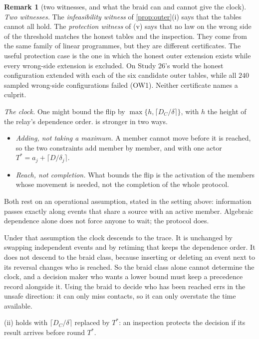 \documentclass[11pt]{article}
\theoremstyle{definition}\newtheorem{definition}[theorem]{Definition}\newtheorem{remark}[theorem]{Remark}\newtheorem{example}[theorem]{Example}\newtheorem{problem}[theorem]{Open problem}\crefname{problem}{Problem}{Problems}
\begin{document}
\begin{remark}[two witnesses, and what the braid can and cannot give the clock]\label{rem:twowitness}
\emph{Two witnesses.} The \emph{infeasibility witness} of \cref{prop:outer}(i) says that the tables cannot all hold. The \emph{protection witness} of (v) says that no law on the wrong side of the threshold matches the honest tables and the inspection. They come from the same family of linear programmes, but they are different certificates. The useful protection case is the one in which the honest outer extension exists while every wrong-side extension is excluded. On Study 26's world the honest configuration extended with each of the six candidate outer tables, while all $240$ sampled wrong-side configurations failed (OW1). Neither certificate names a culprit.

\emph{The clock.} One might bound the flip by $\max\{h,\lceil D_C/\delta\rceil\}$, with $h$ the height of the relay's dependence order.  is stronger in two ways.
\begin{itemize}
\item \emph{Adding, not taking a maximum.} A member cannot move before it is reached, so the two constraints add member by member, and with one actor $T^\ast=a_j+\lceil D/\delta_j\rceil$.
\item \emph{Reach, not completion.} What bounds the flip is the activation of the members whose movement is needed, not the completion of the whole protocol.
\end{itemize}
Both rest on an operational assumption, stated in the setting above: information passes exactly along events that share a source with an active member. Algebraic dependence alone does not force anyone to wait; the protocol does.

Under that assumption the clock descends to the trace. It is unchanged by swapping independent events and by retiming that keeps the dependence order. It does not descend to the braid class, because inserting or deleting an event next to its reversal changes who is reached. So the braid class alone cannot determine the clock, and a decision maker who wants a lower bound must keep a precedence record alongside it. Using the braid to decide who has been reached errs in the unsafe direction: it can only miss contacts, so it can only overstate the time available.
\end{remark}

\begin{corollary}\label{cor:relayprotect}
(ii) holds with $\lceil D_C/\delta\rceil$ replaced by $T^\ast$: an inspection protects the decision if its result arrives before round $T^\ast$.
\end{corollary}
\end{document}
